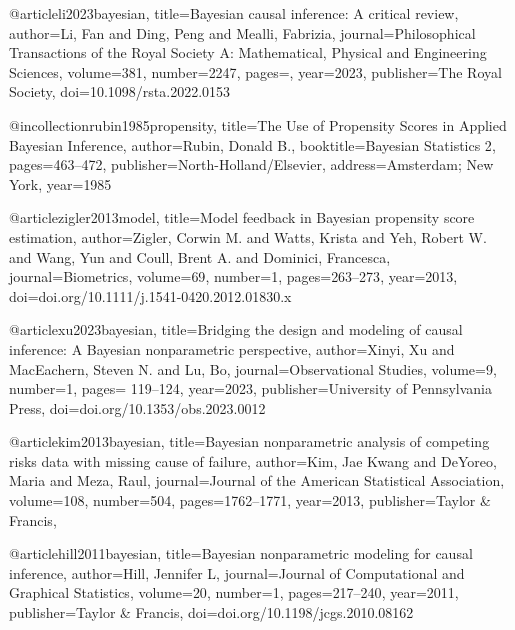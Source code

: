 @article{li2023bayesian,
  title={Bayesian causal inference: A critical review},
  author={Li, Fan and Ding, Peng and Mealli, Fabrizia},
  journal={Philosophical Transactions of the Royal Society A: Mathematical, Physical and Engineering Sciences},
  volume={381},
  number={2247},
  pages={},
  year={2023},
  publisher={The Royal Society},
  doi={10.1098/rsta.2022.0153}
}





@incollection{rubin1985propensity,
  title={The Use of Propensity Scores in Applied Bayesian Inference},
  author={Rubin, Donald B.},
  booktitle={Bayesian Statistics 2},
  pages={463--472},
  publisher={North-Holland/Elsevier},
  address={Amsterdam; New York},
  year={1985}
}





@article{zigler2013model,
  title={Model feedback in Bayesian propensity score estimation},
  author={Zigler, Corwin M. and Watts, Krista and Yeh, Robert W. and Wang, Yun and Coull, Brent A. and Dominici, Francesca},
  journal={Biometrics},
  volume={69},
  number={1},
  pages={263--273},
  year={2013},
  doi={doi.org/10.1111/j.1541-0420.2012.01830.x}
}





@article{xu2023bayesian,
  title={Bridging the design and modeling of causal inference: A
Bayesian nonparametric perspective},
  author={Xinyi, Xu and MacEachern, Steven N. and Lu, Bo},
  journal={Observational Studies},
  volume={9},
  number={1},
  pages={ 119--124},
  year={2023},
  publisher={University of Pennsylvania Press},
  doi={doi.org/10.1353/obs.2023.0012}
}





@article{kim2013bayesian,
  title={Bayesian nonparametric analysis of competing risks data with missing cause of failure},
  author={Kim, Jae Kwang and DeYoreo, Maria and Meza, Raul},
  journal={Journal of the American Statistical Association},
  volume={108},
  number={504},
  pages={1762--1771},
  year={2013},
  publisher={Taylor \& Francis},
  }





@article{hill2011bayesian,
  title={Bayesian nonparametric modeling for causal inference},
  author={Hill, Jennifer L},
  journal={Journal of Computational and Graphical Statistics},
  volume={20},
  number={1},
  pages={217--240},
  year={2011},
  publisher={Taylor \& Francis},
  doi={doi.org/10.1198/jcgs.2010.08162}
}





